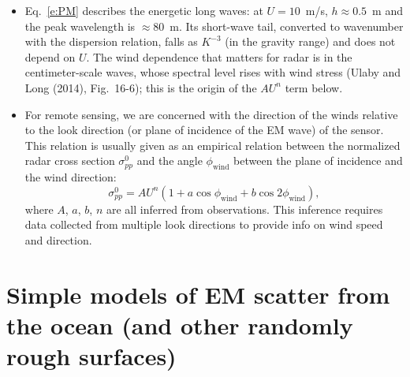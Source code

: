 \documentclass[11pt, oneside]{article}
\begin{document}
\begin{itemize}
	\item Eq.~\ref{e:PM} describes the energetic long waves: at $U = 10$~m/s, $h \approx 0.5$~m and the peak wavelength is $\approx 80$~m. Its short-wave tail, converted to wavenumber with the dispersion relation, falls as $K^{-3}$ (in the gravity range) and does not depend on $U$. The wind dependence that matters for radar is in the centimeter-scale waves, whose spectral level rises with wind stress (Ulaby and Long (2014), Fig.~16-6); this is the origin of the $AU^n$ term below.
	\item For remote sensing, we are concerned with the direction of the winds relative to the look direction (or plane of incidence of the EM wave) of the sensor. This relation is usually given as an empirical relation between the normalized radar cross section $\sigma_{pp}^0$ and the angle $\phi_\mathrm{wind}$ between the plane of incidence and the wind direction:
	\begin{equation}
		\label{e:gmf}
		\sigma_{pp}^0 = AU^n\left(1 + a\cos\phi_\mathrm{wind} + b\cos2\phi_\mathrm{wind}\right),
	\end{equation}
	where $A$, $a$, $b$, $n$ are all inferred from observations. This inference requires data collected from multiple look directions to provide info on wind speed and direction.
\end{itemize}

\section{Simple models of EM scatter from the ocean (and other randomly rough surfaces)}
\label{s:bragg}
\end{document}
